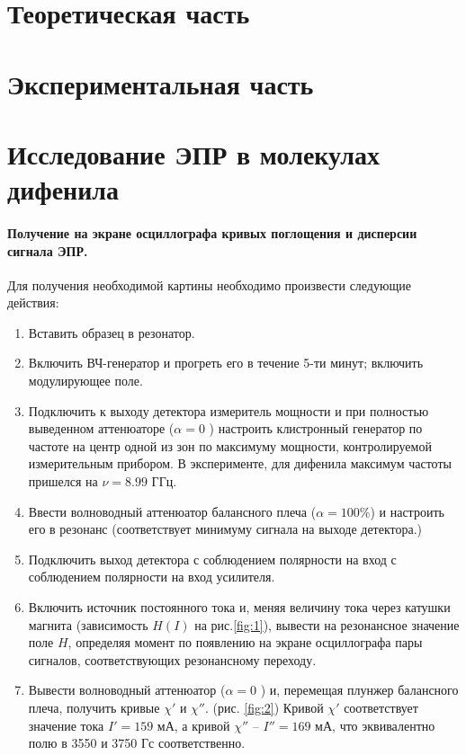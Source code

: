 

\def\labauthors{Виноградов И.Д., Понур К.А., Шиков А.П.}
\def\labgroup{440}
\def\labnumber{1}
\def\labtheme{Исследование твердотельных структур методом ЭПР-спектроскопии}
\def\department{Кафедра квантовой радиофизики и электроники}

\newpage
\section{Теоретическая часть}%


\section{Экспериментальная часть}%
\section{Исследование ЭПР в молекулах дифенила}%
\paragraph{Получение на экране осциллографа кривых поглощения и дисперсии сигнала ЭПР.}%
\label{par:1}
Для получения необходимой картины необходимо произвести следующие действия:
\begin{enumerate}
    \item Вставить образец в резонатор.
    \item Включить ВЧ-генератор и прогреть его в течение 5-ти минут; включить модулирующее поле.
    \item Подключить к выходу детектора измеритель мощности и при полностью выведенном аттенюаторе ($\alpha = 0$ ) настроить клистронный генератор по частоте
        на центр одной из зон по максимуму мощности, контролируемой измерительным прибором. В эксперименте, для дифенила максимум частоты 
        пришелся на $\nu = 8.99$ ГГц.
    \item Ввести волноводный аттенюатор балансного плеча ($\alpha = 100 \% $) и настроить его в резонанс (соответствует минимуму сигнала на выходе детектора.)
    \item Подключить выход детектора с соблюдением полярности на вход с соблюдением полярности на вход усилителя.
    \item Включить источник постоянного тока и, меняя величину тока через катушки магнита (зависимость $H(I)$ на рис.\ref{fig:1}), вывести на резонансное значение поле $H$, определяя момент по появлению на экране осциллографа 
        пары сигналов, соответствующих резонансному переходу. 

    \item Вывести волноводный аттенюатор ($ \alpha = 0$ ) и, перемещая плунжер балансного плеча, получить кривые $\chi'$ и  $\chi''$. (рис. \ref{fig:2})
     Кривой $\chi'$ соответствует значение тока $I' = 159 $ мА,  а кривой $\chi''$ -- $I'' = 169$ мА, что эквивалентно полю в 3550 и 3750 Гс соответственно.
\end{enumerate}


